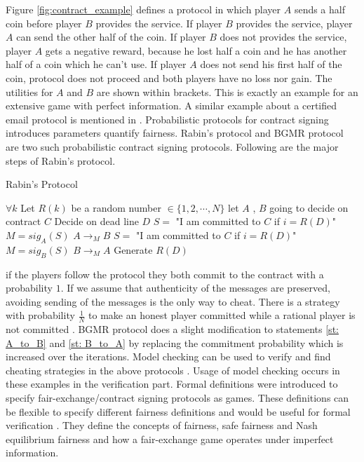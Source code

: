  Figure \ref{fig:contract_example} \cite{Buttyan1999} defines a protocol in which player $A$ sends a half coin before player $B$ provides the service. If player $B$ provides the service, player $A$ can send the other half of the coin. If player $B$ does not provides the service, player $A$ gets a negative reward, because he lost half a coin and he has another half of a coin which he can't use. If player $A$ does not send his first half of the coin, protocol does not proceed and both players have no loss nor gain. The utilities for $A$ and $B$ are shown within brackets. This is exactly an example for an extensive game with perfect information. A similar example about a certified email protocol is mentioned in \cite{Buttyan1999}. \newline
 Probabilistic protocols for contract signing introduces parameters quantify fairness. Rabin's protocol\cite{Rabin83} and BGMR protocol\cite{Ben-Or1990} are two such probabilistic contract signing protocols. Following are the major steps of Rabin's protocol.
 
 \begin{algorithm}[H]
 	\renewcommand{\thealgorithm}{}  
 	\caption{Rabin's Protocol}  
 	\label{protocol1}  
 	\begin{algorithmic}[1]
 		\STATE $\forall k$ Let $R(k)$ be a random number $\in \{1,2, \cdots ,N\}$
 		\STATE let $A$ , $B$ going to decide on contract $C$
 		\STATE Decide on dead line $D$
	 		\STATE $S=$ "I am committed to $C$ if $i=R(D)$" 
	 		\label{st: A_to_B}
	 		\STATE $M=sig_{A}(S)$ 
	 		\STATE $A \rightarrow_{M} B$
	 		\STATE $S=$ "I am committed to $C$ if $i=R(D)$"
	 		\label{st: B_to_A} 
	 		\STATE $M=sig_{B}(S)$ 
	 		\STATE $B \rightarrow_{M} A$ 
 		\ENDFOR
 		\STATE Generate $R(D)$
 	\end{algorithmic}
 \end{algorithm}
  if the players follow the protocol they both commit to the contract with a probability $1$. If we assume that authenticity of the messages are preserved, avoiding sending of the messages is the only way to cheat. There is a strategy with probability $\frac{1}{N}$ to make an honest player committed while a rational player is not committed \cite{Rabin83}. \newline
  BGMR\cite{Ben-Or1990} protocol does a slight modification to statements \ref{st: A_to_B} and \ref{st: B_to_A} by replacing the commitment probability which is increased over the iterations. Model checking can be used to verify and find cheating strategies in the above protocols \cite{Norman2006}. Usage of model checking occurs in these examples in the verification part.\newline
Formal definitions were introduced to specify fair-exchange/contract signing protocols as games. These definitions can be flexible to specify different fairness definitions and would be useful for formal verification \cite{Buttyan1999}. They define the concepts of fairness, safe fairness and Nash equilibrium fairness and how a fair-exchange game operates under imperfect information.\newline
  
